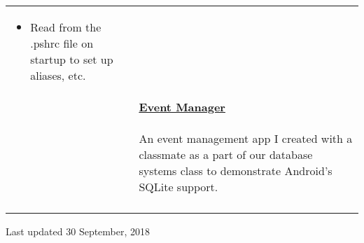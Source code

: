 \documentclass[letterpaper,11pt,oneside]{article}
\begin{document}
\begin{tabularx}{\textwidth}{l X}
\begin{itemize}[label={--}]
        \item Read from the .pshrc file on startup to set up aliases, etc.
    \end{itemize} \\
    & \vspace{-3ex}\textbf{\href{https://github.com/prati0100/EventManager}{Event Manager}} \\
    & \vspace{-2.5ex}\begin{adjustwidth}{}{}An event management app I created with a classmate as a part of our database systems class to demonstrate Android's SQLite support.\end{adjustwidth} \\
    & \\
\end{tabularx}

\centerline{Last updated 30 September, 2018}
\end{document}
